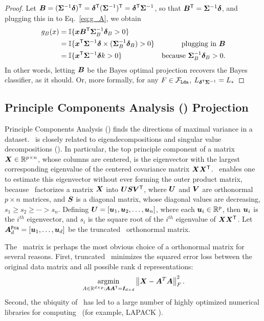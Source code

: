 \documentclass[10pt]{article}
\begin{document}
\begin{proof}
Let $\boldsymbol{B} = (\boldsymbol{\Sigma}^{-1} \boldsymbol{\delta})^{\mathsf{T}} = \boldsymbol{\delta}^{\mathsf{T}} (\boldsymbol{\Sigma}^{-1})^{\mathsf{T}} = \boldsymbol{\delta}^{\mathsf{T}} \boldsymbol{\Sigma}^{-1}$, so that $\boldsymbol{B}^{\mathsf{T}} = \boldsymbol{\Sigma}^{-1} \boldsymbol{\delta}$,
and plugging this in to Eq.~\eqref{eq:g_A}, we obtain
\begin{align*}
g_{B}(x) &= \mathbb{I} \{ \boldsymbol{x} \boldsymbol{B}^{\mathsf{T}}  \boldsymbol{\Sigma}^{-1}_{B} \boldsymbol{\delta}_{B} > 0\} &
\\&= \mathbb{I} \{ \boldsymbol{x}^{\mathsf{T}} \boldsymbol{\Sigma}^{-1} \boldsymbol{\delta} \times (\boldsymbol{\Sigma}^{-1}_{B} \boldsymbol{\delta}_{B}) > 0\} & \text{plugging in $\boldsymbol{B}$}
\\&= \mathbb{I} \{ \boldsymbol{x}^{\mathsf{T}} \boldsymbol{\Sigma}^{-1} \boldsymbol{\delta} k > 0\} & \text{because $\boldsymbol{\Sigma}^{-1}_{B} \boldsymbol{\delta}_{B} > 0$}.
\end{align*}
In other words, letting $\boldsymbol{B}$ be the Bayes optimal projection recovers the Bayes classifier, as it should.
Or, more formally, for any $F \in \mathcal{F}_{{\sc \texttt{Lda}}}$, $L_{\boldsymbol{\delta}^{\mathsf{T}} \boldsymbol{\Sigma}^{-1}} = L_*$
\end{proof}

\subsection[PCA]{Principle Components Analysis (\Pca) Projection}

Principle Components Analysis (\Pca) finds the directions of maximal variance in a dataset.  \Pca~is closely related to eigendecompositions and singular value decompositions (\Svd).  In particular, the top principle component of a matrix $\boldsymbol{X} \in \mathbb{R}^{p \times n}$, whose columns are centered, is the eigenvector with the largest corresponding eigenvalue of the centered covariance matrix $\boldsymbol{X} \boldsymbol{X}^{\mathsf{T}}$.  \Svd~enables one to estimate this eigenvector without ever forming the outer product matrix, because \Svd~factorizes a matrix $\boldsymbol{X}$ into $\boldsymbol{U} \boldsymbol{S} \boldsymbol{V}^{\mathsf{T}}$, where  $\boldsymbol{U}$ and $\boldsymbol{V}$ are orthonormal  ${p \times n}$ matrices, and $\boldsymbol{S}$ is a diagonal matrix, whose diagonal values are decreasing,  $s_1 \geq s_2 \geq \cdots > s_n$.  Defining $\boldsymbol{U} =[\boldsymbol{u}_1, \boldsymbol{u}_2, \ldots, \boldsymbol{u}_n]$, where each $\boldsymbol{u}_i \in \mathbb{R}^p$, then $\boldsymbol{u}_i$ is the $i^{th}$ eigenvector, and $s_i$ is the square root of the $i^{th}$ eigenvalue of $\boldsymbol{X} \boldsymbol{X}^{\mathsf{T}}$.  Let $\boldsymbol{A}^{{\sc \texttt{Pca}}}_d =[\boldsymbol{u}_1, \ldots , \boldsymbol{u}_d]$ be the truncated \Pca~orthonormal matrix.

The \Pca~matrix is perhaps the most obvious choice of a orthonormal matrix for several reasons.  First, truncated \Pca~minimizes the squared error loss between the original data matrix and all possible rank d representations:
\begin{align*}
\argmin_{A \in \Real^{d \times p} : \bA \bA\T = \bI_{d \times d}} \norm{ \bX - \bA^T \bA }_F^2.
\end{align*}
Second, the ubiquity of \Pca~has led to a large number of highly optimized numerical libraries for computing \Pca~(for example, LAPACK \cite{Anderson1999a}).
\end{document}

